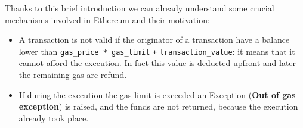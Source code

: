 Thanks to this brief introduction we can already understand some crucial
mechanisms involved in Ethereum and their motivation:
\begin{itemize}
	\item A transaction is not valid if the originator of a transaction have
	a balance lower than \verb|gas_price * gas_limit| \verb|+|
	\verb|transaction_value|:
	it means that it cannot afford the execution. In fact this value is
	deducted upfront and later the remaining gas are refund.
	\item If during the execution the gas limit is exceeded an Exception
	(\textbf{Out of gas exception}) is raised, and the funds are not returned,
	because the execution already took place.
\end{itemize}




